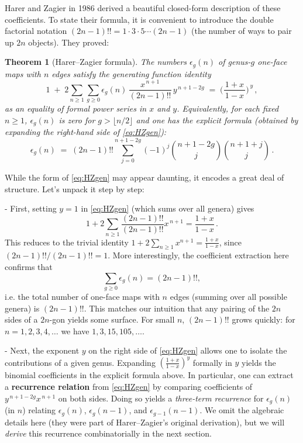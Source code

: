 \documentclass[letterpaper,11pt,oneside,reqno]{article}
\numberwithin{equation}{section}
\newtheorem{theorem}[proposition]{Theorem}
\theoremstyle{definition}
\begin{document}
Harer and Zagier in 1986 derived a beautiful closed-form description of these coefficients. To state their formula, it is convenient to introduce the double factorial notation $(2n-1)!! = 1\cdot 3 \cdot 5 \cdots (2n-1)$ (the number of ways to pair up $2n$ objects). They proved:

\begin{theorem}[Harer–Zagier formula]\label{thm:HZ}
The numbers $\epsilon_g(n)$ of genus-$g$ one-face maps with $n$ edges satisfy the generating function identity
\begin{equation}\label{eq:HZgen}
1 \;+\; 2\sum_{n\ge 1}\sum_{g\ge 0} \epsilon_g(n)\,\frac{x^{\,n+1}}{(2n-1)!!}\,y^{\,n+1-2g} \;=\; \Big( \frac{1 + x}{\,1 - x\,}\Big)^{\,y}\,,
\end{equation}
as an equality of formal power series in $x$ and $y$. Equivalently, for each fixed $n\ge 1$, $\epsilon_g(n)$ is zero for $g > \lfloor n/2\rfloor$ and one has the explicit formula (obtained by expanding the right-hand side of \eqref{eq:HZgen}):
\[ \epsilon_g(n) \;=\; (2n-1)!! \sum_{j=0}^{n+1-2g} (-1)^j \binom{n+1-2g}{j}\binom{n+1+j}{\,j\,}\,. \]
\end{theorem}

While the form of \eqref{eq:HZgen} may appear daunting, it encodes a great deal of structure. Let's unpack it step by step:

- First, setting $y=1$ in \eqref{eq:HZgen} (which sums over all genera) gives
\[ 1 + 2\sum_{n\ge 1} \frac{(2n-1)!!}{(2n-1)!!} x^{\,n+1} = \frac{1+x}{1-x}\,. \]
This reduces to the trivial identity $1 + 2\sum_{n\ge 1} x^{n+1} = \frac{1+x}{1-x}$, since $(2n-1)!!/(2n-1)!!=1$. More interestingly, the coefficient extraction here confirms that
\[ \sum_{g\ge 0} \epsilon_g(n) = (2n-1)!!, \]
i.e. the total number of one-face maps with $n$ edges (summing over all possible genera) is $(2n-1)!!$. This matches our intuition that any pairing of the $2n$ sides of a $2n$-gon yields some surface. For small $n$, $(2n-1)!!$ grows quickly: for $n=1,2,3,4,\dots$ we have $1, 3, 15, 105, \dots$.

- Next, the exponent $y$ on the right side of \eqref{eq:HZgen} allows one to isolate the contributions of a given genus. Expanding $(\frac{1+x}{1-x})^y$ formally in $y$ yields the binomial coefficients in the explicit formula above. In particular, one can extract a \textbf{recurrence relation} from \eqref{eq:HZgen} by comparing coefficients of $y^{\,n+1-2g}x^{\,n+1}$ on both sides. Doing so yields a \emph{three-term recurrence} for $\epsilon_g(n)$ (in $n$) relating $\epsilon_g(n)$, $\epsilon_g(n-1)$, and $\epsilon_{g-1}(n-1)$. We omit the algebraic details here (they were part of Harer–Zagier's original derivation), but we will \emph{derive} this recurrence combinatorially in the next section.
\end{document}
